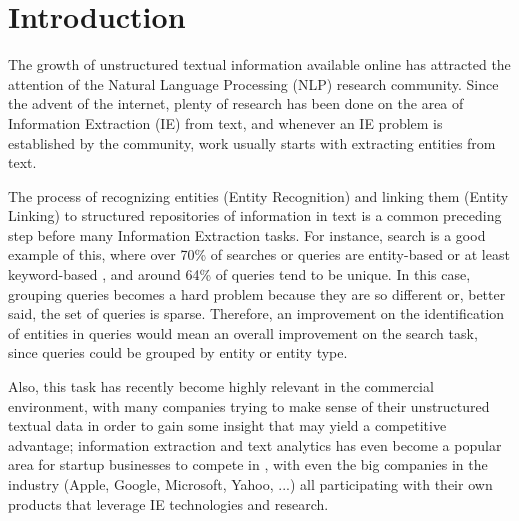 \section{Introduction}
The growth of unstructured textual information available online has attracted the attention of the Natural Language Processing (NLP) research community.
Since the advent of the internet, plenty of research has been done on the area of Information Extraction (IE) from text,
and whenever an IE problem is established by the community, work usually starts with extracting entities from text.

The process of recognizing entities (Entity Recognition) and linking them (Entity Linking) to structured repositories of information in text
is a common preceding step before many Information Extraction tasks.
For instance, search is a good example of this, where over 70\% of searches or queries are entity-based or at least keyword-based \cite{webpatterns},
and around 64\% of queries tend to be unique.
In this case, grouping queries becomes a hard problem because they are so different or, better said, the set of queries is sparse.
Therefore, an improvement on the identification of entities in queries would mean an overall improvement on the search task,
since queries could be grouped by entity or entity type.

Also, this task has recently become highly relevant in the commercial environment, with many companies trying to make sense of their unstructured textual data
in order to gain some insight that may yield a competitive advantage;
information extraction and text analytics has even become a popular area for startup businesses to compete in \cite{techcrunch} \cite{ventureradar},
with even the big companies in the industry (Apple, Google, Microsoft, Yahoo, ...) all participating with their own products that leverage IE technologies and research.

